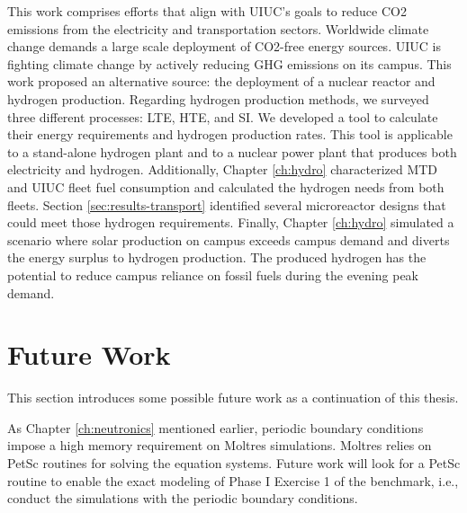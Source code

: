 This work comprises efforts that align with UIUC's goals to reduce \gls{CO2} emissions from the electricity and transportation sectors.
Worldwide climate change demands a large scale deployment of \gls{CO2}-free energy sources.
UIUC is fighting climate change by actively reducing GHG emissions on its campus.
This work proposed an alternative source: the deployment of a nuclear reactor and hydrogen production.
Regarding hydrogen production methods, we surveyed three different processes: LTE, HTE, and SI.
We developed a tool to calculate their energy requirements and hydrogen production rates.
This tool is applicable to a stand-alone hydrogen plant and to a nuclear power plant that produces both electricity and hydrogen.
Additionally, Chapter \ref{ch:hydro} characterized MTD and UIUC fleet fuel consumption and calculated the hydrogen needs from both fleets.
Section \ref{sec:results-transport} identified several microreactor designs that could meet those hydrogen requirements.
Finally, Chapter \ref{ch:hydro} simulated a scenario where solar production on campus exceeds campus demand and diverts the energy surplus to hydrogen production.
The produced hydrogen has the potential to reduce campus reliance on fossil fuels during the evening peak demand.

\section{Future Work}
\label{sec:futwork}

This section introduces some possible future work as a continuation of this thesis.

As Chapter \ref{ch:neutronics} mentioned earlier, periodic boundary conditions impose a high memory requirement on Moltres simulations.
Moltres relies on PetSc routines for solving the equation systems.
Future work will look for a PetSc routine to enable the exact modeling of Phase I Exercise 1 of the benchmark, i.e., conduct the simulations with the periodic boundary conditions.

